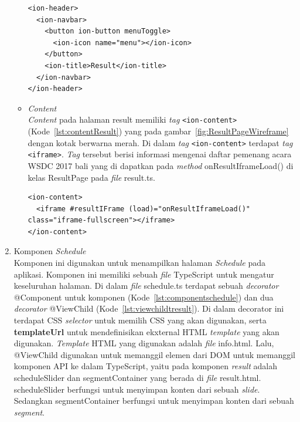 \begin{enumerate}
\begin{itemize}
\newpage

\begin{lstlisting}[label={lst:headerResult}, caption=\textit{Header} pada result.html]
<ion-header>
  <ion-navbar>
    <button ion-button menuToggle>
      <ion-icon name="menu"></ion-icon>
    </button>
    <ion-title>Result</ion-title>
  </ion-navbar>
</ion-header>
\end{lstlisting}

		\item \textit{Content}\\
		\textit{Content} pada halaman result memiliki \textit{tag} \texttt{<ion-content>} (Kode~\ref{lst:contentResult}) yang pada gambar~\ref{fig:ResultPageWireframe} dengan kotak berwarna merah. Di dalam \textit{tag} \texttt{<ion-content>} terdapat \textit{tag} \texttt{<iframe>}. \textit{Tag} tersebut berisi informasi mengenai daftar pemenang acara WSDC 2017 bali yang di dapatkan pada \textit{method} onResultIframeLoad() di kelas ResultPage pada \textit{file} result.ts.
		
\begin{lstlisting}[label={lst:contentResult}, caption=\textit{Content} pada result.html]
<ion-content>
  <iframe #resultIFrame (load)="onResultIframeLoad()" class="iframe-fullscreen"></iframe>
</ion-content>
\end{lstlisting} 
	\end{itemize}
	
	\item Komponen \textit{Schedule}\\ 
	Komponen ini digunakan untuk menampilkan halaman \textit{Schedule} pada aplikasi. Komponen ini memiliki sebuah \textit{file} TypeScript untuk mengatur keseluruhan halaman. Di dalam \textit{file} schedule.ts terdapat sebuah \textit{decorator} @Component untuk komponen (Kode~\ref{lst:componentschedule}) dan dua \textit{decorator} @ViewChild (Kode~\ref{lst:viewchildtresult}). Di dalam decorator ini terdapat CSS \textit{selector} untuk memilih CSS yang akan digunakan, serta \textbf{templateUrl} untuk mendefinisikan ekxternal HTML \textit{template} yang akan digunakan. \textit{Template} HTML yang digunakan adalah \textit{file} info.html. Lalu, @ViewChild digunakan untuk memanggil elemen dari DOM untuk memanggil komponen API ke dalam TypeScript, yaitu pada komponen \textit{result} adalah scheduleSlider dan segmentContainer yang berada di \textit{file} result.html. scheduleSlider berfungsi untuk menyimpan konten dari sebuah \textit{slide}. Sedangkan segmentContainer berfungsi untuk menyimpan konten dari sebuah \textit{segment}.
	

\end{enumerate}
